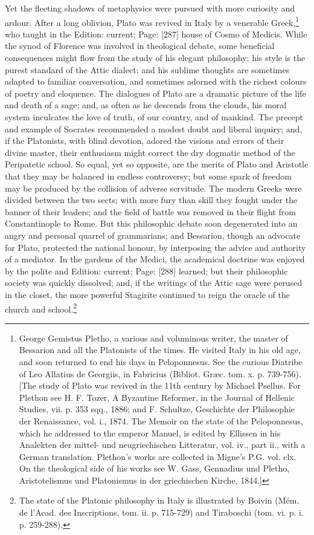 Yet the fleeting shadows of metaphysics were pursued with more curiosity and ardour. After a long oblivion, Plato was revived in Italy by a venerable Greek,\footnote{George Gemistus Pletho, a various and voluminous writer, the master of Bessarion and all the Platonists of the times. He visited Italy in his old age, and soon returned to end his days in Peloponnesus. See the curious Diatribe of Leo Allatius de Georgiis, in Fabricius (Bibliot. Græc. tom. x. p. 739-756). [The study of Plato was revived in the 11th century by Michael Psellus. For Plethon see H. F. Tozer, A Byzantine Reformer, in the Journal of Hellenic Studies, vii. p. 353 sqq., 1886; and F. Schultze, Geschichte der Philosophie der Renaissance, vol. i., 1874. The Memoir on the state of the Peloponnesus, which he addressed to the emperor Manuel, is edited by Ellissen in his Analekten der mittel- und neugriechischen Litteratur, vol. iv., part ii., with a German translation. Plethon\texthebrew{}’s works are collected in Migne\texthebrew{}’s P.G. vol. clx. On the theological side of his works see W. Gass, Gennadius und Pletho, Aristotelismus und Platonismus in der griechischen Kirche, 1844.]} who taught in the Edition: current; Page: [287] house of Cosmo of Medicis. While the synod of Florence was involved in theological debate, some beneficial consequences might flow from the study of his elegant philosophy; his style is the purest standard of the Attic dialect; and his sublime thoughts are sometimes adapted to familiar conversation, and sometimes adorned with the richest colours of poetry and eloquence. The dialogues of Plato are a dramatic picture of the life and death of a sage; and, as often as he descends from the clouds, his moral system inculcates the love of truth, of our country, and of mankind. The precept and example of Socrates recommended a modest doubt and liberal inquiry; and, if the Platonists, with blind devotion, adored the visions and errors of their divine master, their enthusiasm might correct the dry dogmatic method of the Peripatetic school. So equal, yet so opposite, are the merits of Plato and Aristotle that they may be balanced in endless controversy; but some spark of freedom may be produced by the collision of adverse servitude. The modern Greeks were divided between the two sects; with more fury than skill they fought under the banner of their leaders; and the field of battle was removed in their flight from Constantinople to Rome. But this philosophic debate soon degenerated into an angry and personal quarrel of grammarians; and Bessarion, though an advocate for Plato, protected the national honour, by interposing the advice and authority of a mediator. In the gardens of the Medici, the academical doctrine was enjoyed by the polite and Edition: current; Page: [288] learned; but their philosophic society was quickly dissolved; and, if the writings of the Attic sage were perused in the closet, the more powerful Stagirite continued to reign the oracle of the church and school.\footnote{The state of the Platonic philosophy in Italy is illustrated by Boivin (Mém. de l\texthebrew{}’Acad. des Inscriptions, tom. ii. p. 715-729) and Tiraboschi (tom. vi. p. i. p. 259-288).}

